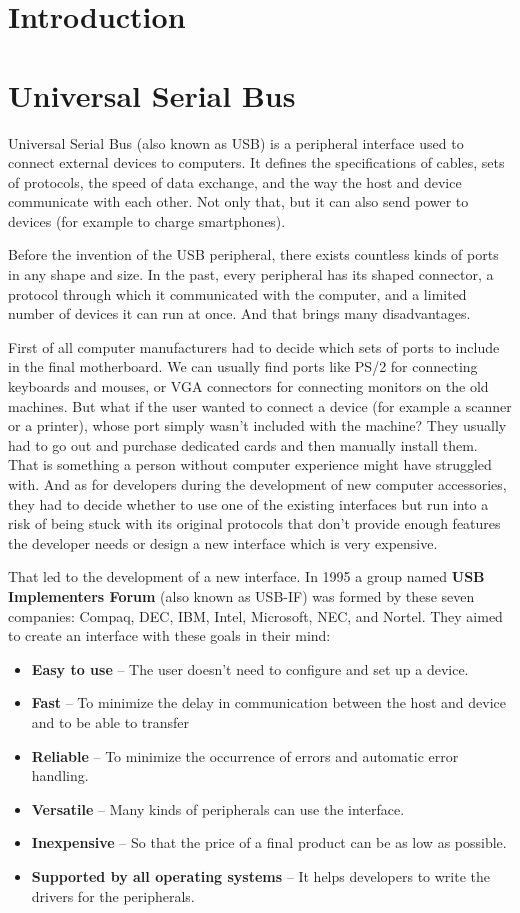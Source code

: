 \chapter{Introduction}

\chapter{Universal Serial Bus}
\label{usb}
Universal Serial Bus (also known as USB) is a peripheral interface used to connect external devices to computers. It defines the specifications of cables, sets of protocols, the speed of data exchange, and the way the host and device communicate with each other. Not only that, but it can also send power to devices (for example to charge smartphones). 

Before the invention of the USB peripheral, there exists countless kinds of ports in any shape and size. In the past, every peripheral has its shaped connector, a protocol through which it communicated with the computer, and a limited number of devices it can run at once. And that brings many disadvantages. 

First of all computer manufacturers had to decide which sets of ports to include in the final motherboard. We can usually find ports like PS/2 for connecting keyboards and mouses, or VGA connectors for connecting monitors on the old machines. But what if the user wanted to connect a device (for example a scanner or a printer), whose port simply wasn't included with the machine? They usually had to go out and purchase dedicated cards and then manually install them. That is something a person without computer experience might have struggled with. And as for developers during the development of new computer accessories, they had to decide whether to use one of the existing interfaces but run into a risk of being stuck with its original protocols that don't provide enough features the developer needs or design a new interface which is very expensive.

That led to the development of a new interface. In 1995 a group named \textbf{USB Implementers Forum} (also known as USB-IF) was formed by these seven companies: Compaq, DEC, IBM, Intel, Microsoft, NEC, and Nortel. They aimed to create an interface with these goals in their mind:
\begin{itemize}
    \item \textbf{Easy to use} \--- The user doesn't need to configure and set up a device. 
    \item \textbf{Fast} \--- To minimize the delay in communication between the host and device and to be able to transfer 
    \item \textbf{Reliable} \--- To minimize the occurrence of errors and automatic error handling.
    \item \textbf{Versatile} \--- Many kinds of peripherals can use the interface.
    \item \textbf{Inexpensive} \--- So that the price of a final product can be as low as possible. 
    \item \textbf{Supported by all operating systems} \--- It helps developers to write the drivers for the peripherals.
\end{itemize}

